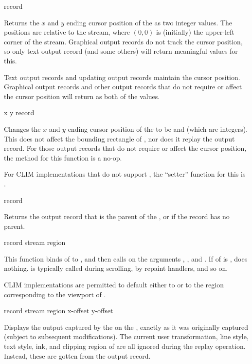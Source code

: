  {record}

Returns the $x$ and $y$ ending cursor position of the 
 as two integer values.  The positions are relative to the stream,
where $(0,0)$ is (initially) the upper-left corner of the stream.  Graphical
output records do not track the cursor position, so only text output record (and
some others) will return meaningful values for this.

Text output records and updating output records maintain the cursor position.
Graphical output records and other output records that do not require or affect
the cursor position will return  as both of the values.

 {x y record}

Changes the $x$ and $y$ ending cursor position of the 
 to be  and  (which are integers).  This does not
affect the bounding rectangle of , nor does it replay the output
record.  For those output records that do not require or affect the cursor
position, the method for this function is a no-op.

For CLIM implementations that do not support , the ``setter'' function
for this is .

 {record}

Returns the output record that is the parent of the 
, or  if the record has no parent.


 {record stream \optional region}

This function binds  of  to , and
then calls  on the arguments ,
, and .  If  of  is
,  does nothing.   is typically called during
scrolling, by repaint handlers, and so on.

CLIM implementations are permitted to default  either to  or
to the region corresponding to the viewport of .

 {record stream \optional region x-offset y-offset}

Displays the output captured by the   on the
 , exactly as it was originally
captured (subject to subsequent modifications).  The current user
transformation, line style, text style, ink, and clipping region of 
are all ignored during the replay operation.  Instead, these are gotten from the
output record.

